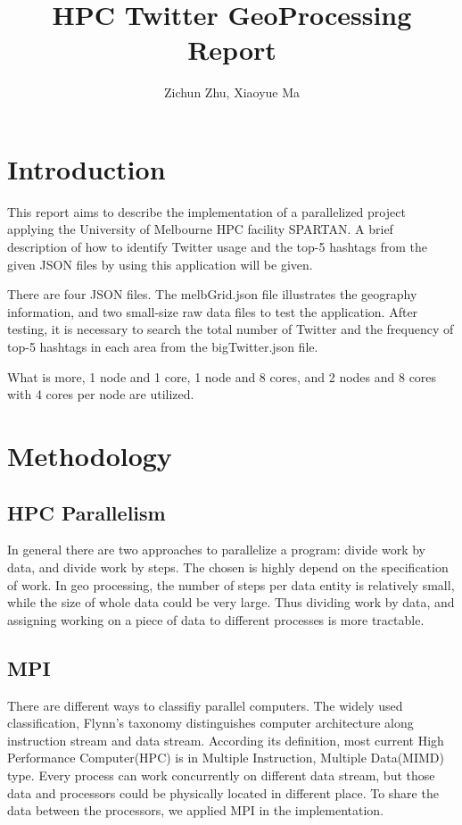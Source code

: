 \documentclass[11pt]{article}
\title{HPC Twitter GeoProcessing Report}
\author
{Zichun Zhu, Xiaoyue Ma}
\begin{document}
\maketitle


\section{Introduction}
This report aims to describe the implementation of a parallelized project applying the University of Melbourne HPC facility SPARTAN. A brief description of how to identify Twitter usage and the top-5 hashtags from the given JSON files by using this application will be given.

There are four JSON files. The melbGrid.json file illustrates the geography information, and two small-size raw data files to test the application. After testing, it is necessary to search the total number of Twitter and the frequency of top-5 hashtags in each area from the bigTwitter.json file.

What is more, 1 node and 1 core, 1 node and 8 cores, and 2 nodes and 8 cores with 4 cores per node are utilized.

\section{Methodology}

\subsection{HPC Parallelism}
In general there are two approaches to parallelize a program: divide work by data, and divide work by steps. The chosen is highly depend on the specification of work. In geo processing, the number of steps per data entity is relatively small, while the size of whole data could be very large. Thus dividing work by data, and assigning working on a piece of data to different processes is more tractable.

\subsection{MPI}
There are different ways to classifiy parallel computers. The widely used classification, Flynn's taxonomy distinguishes computer architecture along instruction stream and data stream. According its definition, most current High Performance Computer(HPC) is in Multiple Instruction, Multiple Data(MIMD) type. Every process can work concurrently on different data stream, but those data and processors could be physically located in different place. To share the data between the processors,  we applied MPI in the implementation.
\end{document}
